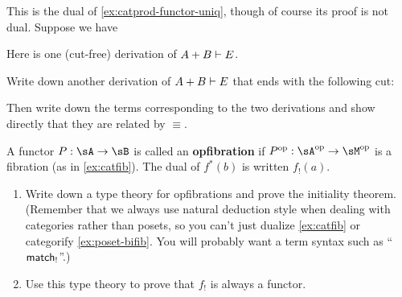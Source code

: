 \begin{ex}\label{ex:catcoprod-functor-uniq}
  This is the dual of \cref{ex:catprod-functor-uniq}, though of course its proof is not dual.
  Suppose we have
  Here is one (cut-free) derivation of $A+B\vdash E$.
  Write down another derivation of $A+B\vdash E$ that ends with the following cut:
  Then write down the terms corresponding to the two derivations and show directly that they are related by $\equiv$.
\end{ex}

\begin{ex}\label{ex:cat-opfib}
  A functor $P:\sA\to\sB$ is called an \textbf{opfibration} if $P\op:\sA\op\to\sM\op$ is a fibration (as in \cref{ex:catfib}).
  The dual of $f^*(b)$ is written $f_!(a)$.
  \begin{enumerate}
  \item Write down a type theory for opfibrations and prove the initiality theorem.
    (Remember that we always use natural deduction style when dealing with categories rather than posets, so you can't just dualize \cref{ex:catfib} or categorify \cref{ex:poset-bifib}.
    You will probably want a term syntax such as ``$\mathsf{match}_!$''.)
  \item Use this type theory to prove that $f_!$ is always a functor.
  \end{enumerate}
\end{ex}


